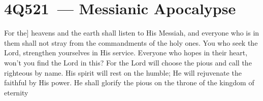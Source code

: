 \section{4Q521~--- Messianic Apocalypse}\label{dss:4q521}

\begin{inparaenum}
     For the] heavens and the earth shall listen to His Messiah,%
     and everyone who is in them shall not stray from the commandments of the holy ones.%
     You who seek the Lord, strengthen yourselves in His service.%
     Everyone who hopes in their heart, won't you find the Lord in this?%
     For the Lord will choose the pious and call the righteous by name.%
     His spirit will rest on the humble; He will rejuvenate the faithful by His power.%
     He shall glorify the pious on the throne of the kingdom of eternity%
\end{inparaenum}
